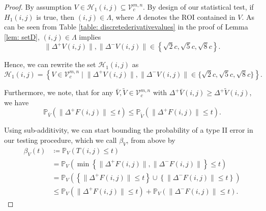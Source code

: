 \documentclass[a4paper,12pt]{article}
\newcommand{\norm}[1]{\lVert#1\rVert}
\theoremstyle{plain}
\theoremstyle{definition}
\numberwithin{equation}{section}
\begin{document}
\begin{proof}
	By assumption $V \in \mathcal{H}_1(i, j) \subseteq \mathcal{V}_c^{m, n}$. By design of our statistical test, if $H_1(i, j)$ is true, then $(i, j) \in \varLambda$, where $\varLambda$ denotes the ROI contained in $V$. As can be seen from Table \ref{table: discretederivativevalues} in the proof of Lemma \ref{lem: setD}, $(i, j) \in \varLambda$ implies
	\begin{equation*}
		\norm{\Delta^+ V(i, j)}, \norm{\Delta^- V(i, j)} \in \left\{ \sqrt{2} c, \sqrt{5} c, \sqrt{8} c \right\}.
	\end{equation*}
	
	Hence, we can rewrite the set $\mathcal{H}_1(i, j)$ as
	\begin{equation*}
		\mathcal{H}_1(i, j) = \left\{ V \in \mathcal{V}_c^{m, n} \mid \norm{\Delta^+ V(i, j)}, \norm{\Delta^- V(i, j)} \in \{ \sqrt{2} c, \sqrt{5} c, \sqrt{8} c \} \right\}.
	\end{equation*}
	
	Furthermore, we note, that for any $\bar{V}, \tilde{V} \in \mathcal{V}_c^{m, n}$ with $\Delta^+ \bar{V}(i, j) \geq \Delta^+ \tilde{V}(i, j)$, we have
	\begin{equation*}
		\mathbb{P}_{\bar{V}}\left( \norm{\Delta^+ F(i, j)} \leq t \right) \leq \mathbb{P}_{\tilde{V}}\left( \norm{\Delta^+ F(i, j)} \leq t \right).
	\end{equation*}
	
	Using sub-additivity, we can start bounding the probability of a type II error in our testing procedure, which we call $\beta_V$, from above by
	\begin{align*}
		\beta_V(t) &\coloneqq \mathbb{P}_V\left( T(i, j) \leq t \right) \\
		&= \mathbb{P}_V\left( \min \left\{ \norm{\Delta^+ F(i, j)}, \norm{\Delta^- F(i, j)} \right\} \leq t \right) \\
		&= \mathbb{P}_V\left( \left\{ \norm{\Delta^+ F(i, j)} \leq t \right\} \cup \left\{ \norm{\Delta^- F(i, j)} \leq t \right\} \right) \\
		&\leq \mathbb{P}_V\left( \norm{\Delta^+ F(i, j)} \leq t \right) + \mathbb{P}_V\left( \norm{\Delta^- F(i, j)} \leq t \right).
	\end{align*}
	

\end{proof}
\end{document}
